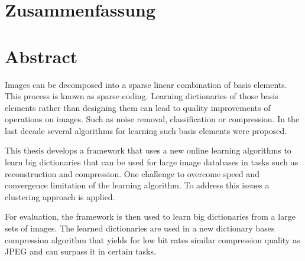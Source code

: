 \newpage
{}
{}
\chapter*{Zusammenfassung}
\thispagestyle{empty}

\newpage
{}
{}
\chapter*{Abstract}
\thispagestyle{empty}

Images can be decomposed into a sparse linear combination of basis
elements. This process is known as sparse coding. Learning dictionaries of
those basis elements rather than designing them can lead to quality improvements
of operations on images. Such as noise removal, classification or compression.
In the last decade several algorithms for learning such basis elements were
proposed.

This thesis develops a framework that uses a new online learning
algorithms to learn big dictionaries that can be used for large image databases
in tasks such as reconstruction and compression. One challenge  to overcome
speed and convergence limitation of the learning algorithm. To address this
issues a clustering approach is applied. 

For evaluation, the framework is then used to learn big dictionaries from a
large sets of images. The learned dictionaries are used in a new dictionary
bases compression algorithm that yields for low bit rates similar compression
quality as JPEG and can surpass it in certain tasks.



